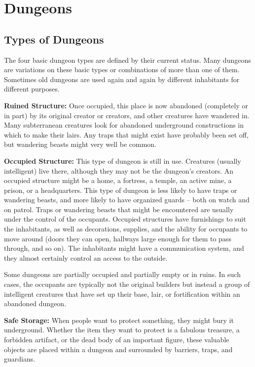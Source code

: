 \section{Dungeons}

\subsection{Types of Dungeons}

The four basic dungeon types are defined by their current status. Many dungeons 
are variations on these basic types or combinations of more than one of them. Sometimes 
old dungeons are used again and again by different inhabitants for different purposes.

\textbf{Ruined Structure:} Once occupied, this place is now abandoned (completely 
or in part) by its original creator or creators, and other creatures have wandered 
in. Many subterranean creatures look for abandoned underground constructions in 
which to make their lairs. Any traps that might exist have probably been set off, 
but wandering beasts might very well be common.

\textbf{Occupied Structure:} This type of dungeon is still in use. Creatures (usually 
intelligent) live there, although they may not be the dungeon's creators. An occupied 
structure might be a home, a fortress, a temple, an active mine, a prison, or a 
headquarters. This type of dungeon is less likely to have traps or wandering beasts, 
and more likely to have organized guards -- both on watch and on patrol. Traps or 
wandering beasts that might be encountered are usually under the control of the 
occupants. Occupied structures have furnishings to suit the inhabitants, as well 
as decorations, supplies, and the ability for occupants to move around (doors they 
can open, hallways large enough for them to pass through, and so on). The inhabitants 
might have a communication system, and they almost certainly control an access 
to the outside.

Some dungeons are partially occupied and partially empty or in ruins. In such cases, 
the occupants are typically not the original builders but instead a group of intelligent 
creatures that have set up their base, lair, or fortification within an abandoned 
dungeon.

\textbf{Safe Storage:} When people want to protect something, they might bury it 
underground. Whether the item they want to protect is a fabulous treasure, a forbidden 
artifact, or the dead body of an important figure, these valuable objects are placed 
within a dungeon and surrounded by barriers, traps, and guardians.

